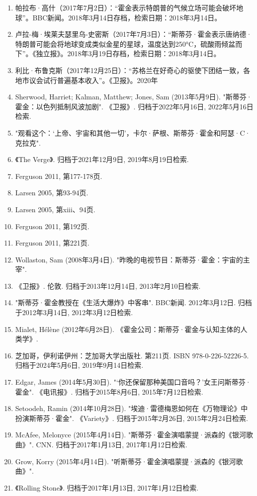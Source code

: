 \begin{enumerate}
\item 帕拉布·高什（2017年7月2日）：“霍金表示特朗普的气候立场可能会破坏地球”。BBC新闻。2018年3月14日存档，检索日期：2018年3月14日。
\item 卢拉-梅·埃莱夫瑟里乌-史密斯（2017年7月3日）：“斯蒂芬·霍金表示唐纳德·特朗普可能会将地球变成类似金星的星球，温度达到250°C，硫酸雨倾盆而下”。《独立报》。2018年3月19日存档，检索日期：2018年3月14日。
\item 利比·布鲁克斯（2017年12月25日）：“苏格兰在好奇心的驱使下团结一致，各地市议会试行普遍基本收入”。《卫报》。2020年
\item Sherwood, Harriet; Kalman, Matthew; Jones, Sam (2013年5月9日). "斯蒂芬·霍金：以色列抵制风波加剧". 《卫报》. 归档于2022年5月16日, 2022年5月16日检索.
\item "观看这个：‘上帝、宇宙和其他一切’，卡尔·萨根、斯蒂芬·霍金和阿瑟·C·克拉克". \item 《The Verge》. 归档于2021年12月9日, 2019年8月19日检索.
\item Ferguson 2011, 第177-178页.
\item Larsen 2005, 第93-94页.
\item Larsen 2005, 第xiii、94页.
\item Ferguson 2011, 第192页.
\item Ferguson 2011, 第221页.
\item Wollaston, Sam (2008年3月4日). "昨晚的电视节目：斯蒂芬·霍金：宇宙的主宰". \item 《卫报》. 伦敦. 归档于2013年12月14日, 2013年2月10日检索.
\item "斯蒂芬·霍金教授在《生活大爆炸》中客串". BBC新闻. 2012年3月12日. 归档于2012年3月14日, 2012年3月12日检索.
\item Mialet, Hélène (2012年6月28日). 《霍金公司：斯蒂芬·霍金与认知主体的人类学》. \item 芝加哥，伊利诺伊州：芝加哥大学出版社. 第211页. ISBN 978-0-226-52226-5. 归档于2024年5月6日, 2019年9月14日检索.
\item Edgar, James (2014年5月30日). "‘你还保留那种美国口音吗？’女王问斯蒂芬·霍金". 《电讯报》. 归档于2015年8月6日, 2015年7月12日检索.
\item Setoodeh, Ramin (2014年10月28日). "埃迪·雷德梅恩如何在《万物理论》中扮演斯蒂芬·霍金". 《Variety》. 归档于2015年2月26日, 2015年2月24日检索.
\item McAfee, Melonyce (2015年4月14日). "斯蒂芬·霍金演唱蒙提·派森的《银河歌曲》". CNN. 归档于2017年1月13日, 2017年1月12日检索.
\item Grow, Korry (2015年4月14日). "听斯蒂芬·霍金演唱蒙提·派森的《银河歌曲》". \item 《Rolling Stone》. 归档于2017年1月13日, 2017年1月12日检索.

\end{enumerate}
